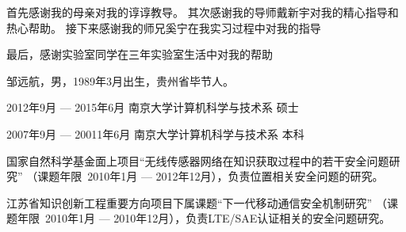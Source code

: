 \documentclass[master]{njuthesis}
\begin{document}
\begin{acknowledgement}
  首先感谢我的母亲对我的谆谆教导。
  其次感谢我的导师戴新宇对我的精心指导和热心帮助。
  接下来感谢我的师兄奚宁在我实习过程中对我的指导

  最后，感谢实验室同学在三年实验室生活中对我的帮助
\end{acknowledgement}



\backmatter


\nocite{*}


%
%

\begin{resume}
\begin{authorinfo}
\noindent 邹远航，男，1989年3月出生，贵州省毕节人。
\end{authorinfo}
\begin{education}
\item[2012年9月 --- 2015年6月] 南京大学计算机科学与技术系 \hfill 硕士
\item[2007年9月 --- 20011年6月] 南京大学计算机科学与技术系 \hfill 本科
\end{education}

\begin{projects}
\item 国家自然科学基金面上项目``无线传感器网络在知识获取过程中的若干安全问题研究''
（课题年限~2010年1月 --- 2012年12月），负责位置相关安全问题的研究。
\item 江苏省知识创新工程重要方向项目下属课题``下一代移动通信安全机制研究''
（课题年限~2010年1月 --- 2010年12月），负责LTE/SAE认证相关的安全问题研究。
\end{projects}
\end{resume}

\makelicense

\end{document}
